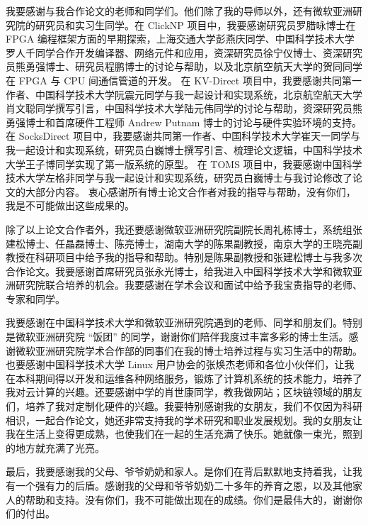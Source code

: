\begin{acknowledgements}
我要感谢与我合作论文的老师和同学们。他们除了我的导师以外，还有微软亚洲研究院的研究员和实习生同学。在 ClickNP 项目中，我要感谢研究员罗腊咏博士在 FPGA 编程框架方面的早期探索，上海交通大学彭燕庆同学、中国科学技术大学罗人千同学合作开发编译器、网络元件和应用，资深研究员徐宁仪博士、资深研究员熊勇强博士、研究员程鹏博士的讨论与帮助，以及北京航空航天大学的贺同同学在 FPGA 与 CPU 间通信管道的开发。
在 KV-Direct 项目中，我要感谢共同第一作者、中国科学技术大学阮震元同学与我一起设计和实现系统，北京航空航天大学肖文聪同学撰写引言，中国科学技术大学陆元伟同学的讨论与帮助，资深研究员熊勇强博士和首席硬件工程师 Andrew Putnam 博士的讨论与硬件实验环境的支持。
在 SocksDirect 项目中，我要感谢共同第一作者、中国科学技术大学崔天一同学与我一起设计和实现系统，研究员白巍博士撰写引言、梳理论文逻辑，中国科学技术大学王子博同学实现了第一版系统的原型。
在 TOMS 项目中，我要感谢中国科学技术大学左格非同学与我一起设计和实现系统，研究员白巍博士与我讨论修改了论文的大部分内容。
衷心感谢所有博士论文合作者对我的指导与帮助，没有你们，我是不可能做出这些成果的。

除了以上论文合作者外，我还要感谢微软亚洲研究院副院长周礼栋博士，系统组张建松博士、任晶磊博士、陈亮博士，湖南⼤学的陈果副教授，南京⼤学的王晓亮副教授在科研项⽬中给予我的指导和帮助。特别是陈果副教授和张建松博士与我多次合作论文。我要感谢首席研究员张永光博士，给我进入中国科学技术⼤学和微软亚洲研究院联合培养的机会。我要感谢在学术会议和面试中给予我宝贵指导的老师、专家和同学。

我要感谢在中国科学技术⼤学和微软亚洲研究院遇到的⽼师、同学和朋友们。特别是微软亚洲研究院 ``饭团'' 的同学，谢谢你们陪伴我度过丰富多彩的博士生活。感谢微软亚洲研究院学术合作部的同事们在我的博士培养过程与实习生活中的帮助。也要感谢中国科学技术大学 Linux 用户协会的张焕杰老师和各位小伙伴们，让我在本科期间得以开发和运维各种网络服务，锻炼了计算机系统的技术能力，培养了我对云计算的兴趣。还要感谢中学的肖世康同学，教我做网站；区块链领域的朋友们，培养了我对定制化硬件的兴趣。我要特别感谢我的女朋友，我们不仅因为科研相识，一起合作论文，她还非常支持我的学术研究和职业发展规划。我的女朋友让我在生活上变得更成熟，也使我们在一起的生活充满了快乐。她就像一束光，照到的地方就充满了光亮。

最后，我要感谢我的⽗母、爷爷奶奶和家⼈。是你们在背后默默地⽀持着我，让我有⼀个强有⼒的后盾。感谢我的⽗母和爷爷奶奶⼆⼗多年的养育之恩，以及其他家⼈的帮助和⽀持。没有你们，我不可能做出现在的成绩。你们是最伟⼤的，谢谢你们的付出。
\end{acknowledgements}
